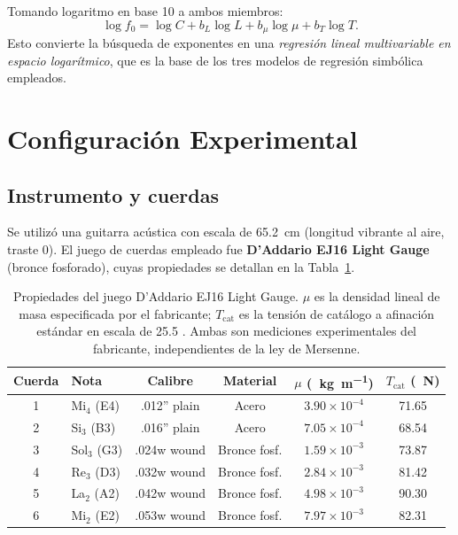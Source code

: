 \documentclass[12pt,a4paper]{article}
\begin{document}
Tomando logaritmo en base 10 a ambos miembros:
\begin{equation}
  \log f_0 = \log C + b_L\log L + b_\mu\log\mu + b_T\log T.
\end{equation}
Esto convierte la búsqueda de exponentes en una \emph{regresión lineal
multivariable en espacio logarítmico}, que es la base de los tres modelos
de regresión simbólica empleados.

\section{Configuración Experimental}

\subsection{Instrumento y cuerdas}

Se utilizó una guitarra acústica con escala de \SI{65.2}{\centi\meter}
(longitud vibrante al aire, traste 0). El juego de cuerdas empleado fue
\textbf{D'Addario EJ16 Light Gauge} (bronce fosforado), cuyas propiedades
se detallan en la Tabla~\ref{tab:cuerdas}.

\begin{table}[H]
\centering
\caption{Propiedades del juego D'Addario EJ16 Light Gauge.
  $\mu$ es la densidad lineal de masa especificada por el fabricante;
  $T_\text{cat}$ es la tensión de catálogo a afinación estándar en
  escala de \SI{25.5}{\inch} \protect\cite{daddario}.
  Ambas son mediciones experimentales del fabricante, independientes
  de la ley de Mersenne.}
\label{tab:cuerdas}
\smallskip
\begin{tabular}{clcccc}
\toprule
\textbf{Cuerda} & \textbf{Nota} & \textbf{Calibre} & \textbf{Material}
  & $\mu$ (\SI{}{\kg\per\m}) & $T_\text{cat}$ (\SI{}{\newton}) \\
\midrule
1 & Mi$_4$ (E4) & .012'' plain & Acero         & $3.90\times10^{-4}$ & 71.65 \\
2 & Si$_3$ (B3) & .016'' plain & Acero         & $7.05\times10^{-4}$ & 68.54 \\
3 & Sol$_3$ (G3)& .024w wound  & Bronce fosf.  & $1.59\times10^{-3}$ & 73.87 \\
4 & Re$_3$ (D3) & .032w wound  & Bronce fosf.  & $2.84\times10^{-3}$ & 81.42 \\
5 & La$_2$ (A2) & .042w wound  & Bronce fosf.  & $4.98\times10^{-3}$ & 90.30 \\
6 & Mi$_2$ (E2) & .053w wound  & Bronce fosf.  & $7.97\times10^{-3}$ & 82.31 \\
\bottomrule
\end{tabular}
\end{table}
\end{document}
